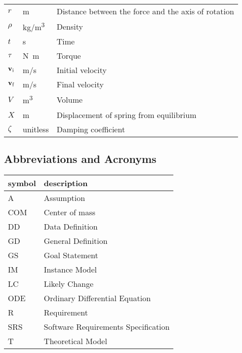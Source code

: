 \documentclass[12pt]{article}
\begin{document}
\begin{longtable}{l l p{12cm}}
  $r$ & \si[per-mode=symbol] {\metre}   &Distance between the force and the axis of rotation
  \\ 
  $\rho$ & \si[per-mode=symbol] {\kilo\gram\per\metre^{3}}   &Density
  \\ 
  $t$ & \si[per-mode=symbol] {\second}   &Time
  \\ 
  $\bf{\tau}$ & \si[per-mode=symbol] {\newton\metre}   &Torque
  \\ 
  $\bf{v_\text{i}}$ & \si[per-mode=symbol] {\metre\per\second}   &Initial velocity
  \\ 
  $\bf{v_\text{f}}$ & \si[per-mode=symbol] {\metre\per\second}   &Final velocity
  \\ 
  $V$ & \si[per-mode=symbol] {\metre^{3}}   &Volume
  \\ 
  $X$ & \si[per-mode=symbol] {\metre}   &Displacement of spring from equilibrium
  \\ 
  $\zeta$ & unitless  &Damping coefficient
  \\ 
  \bottomrule
\end{longtable}

\subsection{Abbreviations and Acronyms}

\renewcommand{\arraystretch}{1.2}
\begin{tabular}{l l} 
  \toprule		
  \textbf{symbol} & \textbf{description}\\
  \midrule 
  A & Assumption\\
  COM & Center of mass\\
  DD & Data Definition\\
  GD & General Definition\\
  GS & Goal Statement\\
  IM & Instance Model\\
  LC & Likely Change\\
  ODE & Ordinary Differential Equation\\
  R & Requirement\\
  SRS & Software Requirements Specification\\
  T & Theoretical Model\\
  \bottomrule
\end{tabular}\\


%
%
\end{document}
